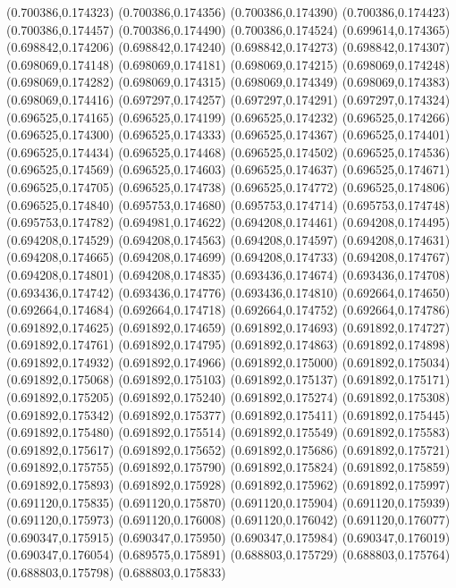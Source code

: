 (0.700386,0.174323)
(0.700386,0.174356)
(0.700386,0.174390)
(0.700386,0.174423)
(0.700386,0.174457)
(0.700386,0.174490)
(0.700386,0.174524)
(0.699614,0.174365)
(0.698842,0.174206)
(0.698842,0.174240)
(0.698842,0.174273)
(0.698842,0.174307)
(0.698069,0.174148)
(0.698069,0.174181)
(0.698069,0.174215)
(0.698069,0.174248)
(0.698069,0.174282)
(0.698069,0.174315)
(0.698069,0.174349)
(0.698069,0.174383)
(0.698069,0.174416)
(0.697297,0.174257)
(0.697297,0.174291)
(0.697297,0.174324)
(0.696525,0.174165)
(0.696525,0.174199)
(0.696525,0.174232)
(0.696525,0.174266)
(0.696525,0.174300)
(0.696525,0.174333)
(0.696525,0.174367)
(0.696525,0.174401)
(0.696525,0.174434)
(0.696525,0.174468)
(0.696525,0.174502)
(0.696525,0.174536)
(0.696525,0.174569)
(0.696525,0.174603)
(0.696525,0.174637)
(0.696525,0.174671)
(0.696525,0.174705)
(0.696525,0.174738)
(0.696525,0.174772)
(0.696525,0.174806)
(0.696525,0.174840)
(0.695753,0.174680)
(0.695753,0.174714)
(0.695753,0.174748)
(0.695753,0.174782)
(0.694981,0.174622)
(0.694208,0.174461)
(0.694208,0.174495)
(0.694208,0.174529)
(0.694208,0.174563)
(0.694208,0.174597)
(0.694208,0.174631)
(0.694208,0.174665)
(0.694208,0.174699)
(0.694208,0.174733)
(0.694208,0.174767)
(0.694208,0.174801)
(0.694208,0.174835)
(0.693436,0.174674)
(0.693436,0.174708)
(0.693436,0.174742)
(0.693436,0.174776)
(0.693436,0.174810)
(0.692664,0.174650)
(0.692664,0.174684)
(0.692664,0.174718)
(0.692664,0.174752)
(0.692664,0.174786)
(0.691892,0.174625)
(0.691892,0.174659)
(0.691892,0.174693)
(0.691892,0.174727)
(0.691892,0.174761)
(0.691892,0.174795)
(0.691892,0.174863)
(0.691892,0.174898)
(0.691892,0.174932)
(0.691892,0.174966)
(0.691892,0.175000)
(0.691892,0.175034)
(0.691892,0.175068)
(0.691892,0.175103)
(0.691892,0.175137)
(0.691892,0.175171)
(0.691892,0.175205)
(0.691892,0.175240)
(0.691892,0.175274)
(0.691892,0.175308)
(0.691892,0.175342)
(0.691892,0.175377)
(0.691892,0.175411)
(0.691892,0.175445)
(0.691892,0.175480)
(0.691892,0.175514)
(0.691892,0.175549)
(0.691892,0.175583)
(0.691892,0.175617)
(0.691892,0.175652)
(0.691892,0.175686)
(0.691892,0.175721)
(0.691892,0.175755)
(0.691892,0.175790)
(0.691892,0.175824)
(0.691892,0.175859)
(0.691892,0.175893)
(0.691892,0.175928)
(0.691892,0.175962)
(0.691892,0.175997)
(0.691120,0.175835)
(0.691120,0.175870)
(0.691120,0.175904)
(0.691120,0.175939)
(0.691120,0.175973)
(0.691120,0.176008)
(0.691120,0.176042)
(0.691120,0.176077)
(0.690347,0.175915)
(0.690347,0.175950)
(0.690347,0.175984)
(0.690347,0.176019)
(0.690347,0.176054)
(0.689575,0.175891)
(0.688803,0.175729)
(0.688803,0.175764)
(0.688803,0.175798)
(0.688803,0.175833)
